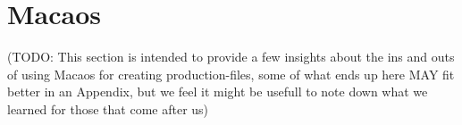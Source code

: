 \section {Macaos}

(TODO: This section is intended to provide a few insights about the
ins and outs of using Macaos for creating production-files, some of
what ends up here MAY fit better in an Appendix, but we feel it might
be usefull to note down what we learned for those that come after us)
